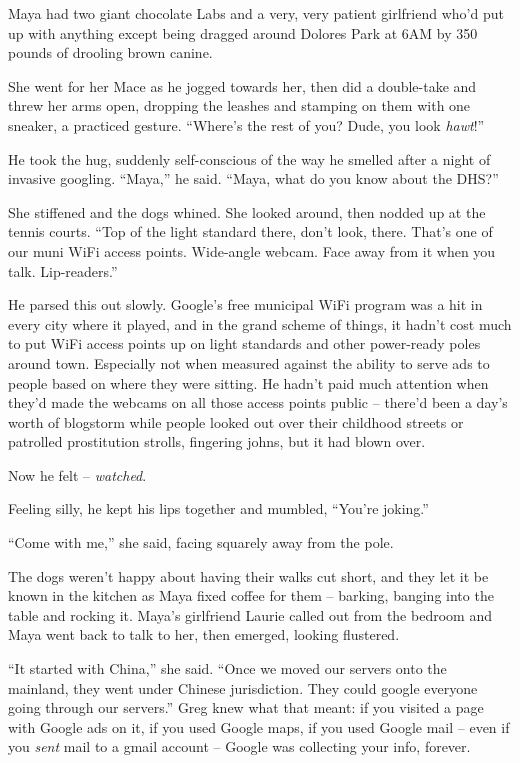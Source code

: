 Maya had two giant chocolate Labs and a very, very patient girlfriend 
who'd put up with anything except being dragged around Dolores Park at 
6AM by 350 pounds of drooling brown canine.

She went for her Mace as he jogged towards her, then did a double-take 
and threw her arms open, dropping the leashes and stamping on them with 
one sneaker, a practiced gesture. “Where's the rest of you? Dude, you 
look \emph{hawt}!”

He took the hug, suddenly self-conscious of the way he smelled after a 
night of invasive googling. “Maya,” he said. “Maya, what do you 
know about the DHS?”

She stiffened and the dogs whined. She looked around, then nodded up at 
the tennis courts. “Top of the light standard there, don't look, 
there. That's one of our muni WiFi access points. Wide-angle webcam. 
Face away from it when you talk. Lip-readers.”

He parsed this out slowly. Google's free municipal WiFi program was a 
hit in every city where it played, and in the grand scheme of things, 
it hadn't cost much to put WiFi access points up on light standards and 
other power-ready poles around town. Especially not when measured 
against the ability to serve ads to people based on where they were 
sitting. He hadn't paid much attention when they'd made the webcams on 
all those access points public -- there'd been a day's worth of 
blogstorm while people looked out over their childhood streets or 
patrolled prostitution strolls, fingering johns, but it had blown over.

Now he felt -- \emph{watched}.

Feeling silly, he kept his lips together and mumbled, “You're 
joking.”

“Come with me,” she said, facing squarely away from the pole.

\tb

The dogs weren't happy about having their walks cut short, and they let 
it be known in the kitchen as Maya fixed coffee for them -- barking, 
banging into the table and rocking it. Maya's girlfriend Laurie called 
out from the bedroom and Maya went back to talk to her, then emerged, 
looking flustered.

“It started with China,” she said. “Once we moved our servers 
onto the mainland, they went under Chinese jurisdiction. They could 
google everyone going through our servers.” Greg knew what that 
meant: if you visited a page with Google ads on it, if you used Google 
maps, if you used Google mail -- even if you \emph{sent} mail to a 
gmail account -- Google was collecting your info, forever.

